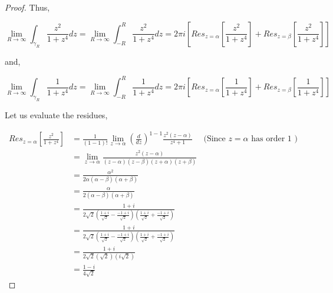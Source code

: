 \documentclass{article}
\begin{document}
\begin{proof}
    Thus, 

    \begin{equation*}
        \lim_{R \to \infty} \int_{\gamma_R} \frac{z^2}{1 + z^4} dz = \lim_{R \to \infty} \int_{-R}^{R}  \frac{z^2}{1 + z^4} dz = 2 \pi i \left[Res_{z = \alpha}\left[\frac{z^2}{1 + z^4}\right] + Res_{z = \beta}\left[\frac{z^2}{1 + z^4}\right]\right]
    \end{equation*} 

    and, 

    \begin{equation*}
        \lim_{R \to \infty} \int_{\gamma_R} \frac{1}{1 + z^4} dz = \lim_{R \to \infty} \int_{-R}^{R}  \frac{1}{1 + z^4} dz = 2 \pi i \left[Res_{z = \alpha}\left[\frac{1}{1 + z^4}\right] + Res_{z = \beta}\left[\frac{1}{1 + z^4}\right]\right]
    \end{equation*}


    Let us evaluate the residues, 

    \begin{align*}
        Res_{z = \alpha}\left[\frac{z^2}{1 + z^4}\right] &= \frac{1}{(1 - 1)!} \lim_{z \to \alpha} \left(\frac{d}{dz}\right)^{1 - 1}  \frac{z^2 (z - \alpha)}{z^4 + 1} & \text{(Since $z = \alpha$ has order 1 )} \\
        &= \lim_{z \to \alpha} \frac{z^2 (z - \alpha)}{(z - \alpha)(z - \beta)(z + \alpha)(z + \beta)} \\
        &= \frac{\alpha^2}{2\alpha(\alpha - \beta)(\alpha + \beta)} \\
        &= \frac{\alpha}{2(\alpha - \beta)(\alpha + \beta)} \\
        &= \frac{1 + i}{2\sqrt{2}\left(\frac{1 + i}{\sqrt{2}} - \frac{-1 + i}{\sqrt{2}}\right)\left(\frac{1 + i}{\sqrt{2}} + \frac{-1 + i}{\sqrt{2}}\right)} \\
        &= \frac{1 + i}{2\sqrt{2}\left(\frac{1 + i}{\sqrt{2}} - \frac{-1 + i}{\sqrt{2}}\right)\left(\frac{1 + i}{\sqrt{2}} + \frac{-1 + i}{\sqrt{2}}\right)}  \\
        &= \frac{1 + i}{2\sqrt{2}\left(\sqrt{2}\right)\left(i\sqrt{2}\right)} \\
        &= \frac{1 - i}{4\sqrt{2}}
    \end{align*}


\end{proof}
\end{document}
